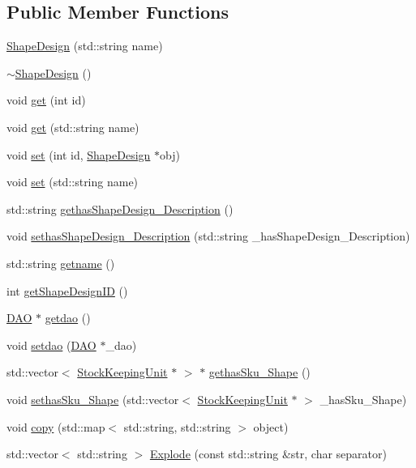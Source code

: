 \subsection*{Public Member Functions}
\begin{DoxyCompactItemize}
\item 
\hyperlink{class_shape_design_aedc21618d3ec8664249174df469e8637}{ShapeDesign} (std::string name)
\item 
\hyperlink{class_shape_design_afa9b46c2708f8c39abd1f6b92740eab4}{$\sim$ShapeDesign} ()
\item 
void \hyperlink{class_shape_design_aefc72191093f49bf73fa4a87bdf3f1b4}{get} (int id)
\item 
void \hyperlink{class_shape_design_ae2e1f8b4b42df5ca45ac96f4ec62daa8}{get} (std::string name)
\item 
void \hyperlink{class_shape_design_a2c1cd4acfb18029ea6e6b3d01ecc48ad}{set} (int id, \hyperlink{class_shape_design}{ShapeDesign} $\ast$obj)
\item 
void \hyperlink{class_shape_design_a29cef64365065520c765ca7df0a8a485}{set} (std::string name)
\item 
std::string \hyperlink{class_shape_design_a2478c14354b03c334037f23275e1e93c}{gethasShapeDesign\_\-Description} ()
\item 
void \hyperlink{class_shape_design_ad42801a33d3a7a41d1c5568fc5a12038}{sethasShapeDesign\_\-Description} (std::string \_\-hasShapeDesign\_\-Description)
\item 
std::string \hyperlink{class_shape_design_a0c1cddad8b051becd70ddc56f312615b}{getname} ()
\item 
int \hyperlink{class_shape_design_a7ff362d1a39df7ec6be88640369eac96}{getShapeDesignID} ()
\item 
\hyperlink{class_d_a_o}{DAO} $\ast$ \hyperlink{class_shape_design_aff1853621aa7cb5a0fdc0c0061ab543a}{getdao} ()
\item 
void \hyperlink{class_shape_design_a06b9ee8b31a62eca03a14adaa90626cf}{setdao} (\hyperlink{class_d_a_o}{DAO} $\ast$\_\-dao)
\item 
std::vector$<$ \hyperlink{class_stock_keeping_unit}{StockKeepingUnit} $\ast$ $>$ $\ast$ \hyperlink{class_shape_design_a1b6a11d922f4347a56a6ca9a6514a3ef}{gethasSku\_\-Shape} ()
\item 
void \hyperlink{class_shape_design_ad8408b4a713b02679241beadbf0723cf}{sethasSku\_\-Shape} (std::vector$<$ \hyperlink{class_stock_keeping_unit}{StockKeepingUnit} $\ast$ $>$ \_\-hasSku\_\-Shape)
\item 
void \hyperlink{class_shape_design_a9da3d7320739c6798719f1bfe56b158d}{copy} (std::map$<$ std::string, std::string $>$ object)
\item 
std::vector$<$ std::string $>$ \hyperlink{class_shape_design_a490d6ba1e2e22dbe6f88da126ab54a49}{Explode} (const std::string \&str, char separator)
\end{DoxyCompactItemize}


